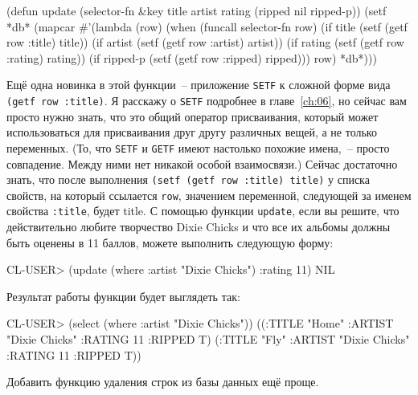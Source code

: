 \begin{myverb}
(defun update (selector-fn &key title artist rating (ripped nil ripped-p))
  (setf *db*
        (mapcar
         #'(lambda (row)
             (when (funcall selector-fn row)
               (if title    (setf (getf row :title) title))
               (if artist   (setf (getf row :artist) artist))
               (if rating   (setf (getf row :rating) rating))
               (if ripped-p (setf (getf row :ripped) ripped)))
             row) *db*)))
\end{myverb}

Ещё одна новинка в этой функции~-- приложение \lstinline{SETF} к
сложной форме вида \lstinline{(getf row :title)}. Я расскажу о \lstinline{SETF} подробнее в главе~\ref{ch:06},
но сейчас вам просто нужно знать, что это общий оператор присваивания, который может
использоваться для присваивания друг другу различных вещей, а не только переменных. (То,
что \lstinline{SETF} и \lstinline{GETF} имеют настолько похожие имена,~-- просто совпадение. Между
ними нет никакой особой взаимосвязи.) Сейчас достаточно знать, что после выполнения
\lstinline{(setf (getf row :title) title)} у списка свойств, на который ссылается \lstinline{row},
значением переменной, следующей за именем свойства \lstinline{:title}, будет title. С помощью
функции \lstinline{update}, если вы решите, что действительно любите творчество Dixie Chicks и
что все их альбомы должны быть оценены в 11 баллов, можете выполнить следующую
форму:

\begin{myverb}
CL-USER> (update (where :artist "Dixie Chicks") :rating 11)
NIL
\end{myverb}

Результат работы функции будет выглядеть так:

\begin{myverb}
CL-USER> (select (where :artist "Dixie Chicks"))
((:TITLE "Home" :ARTIST "Dixie Chicks" :RATING 11 :RIPPED T)
 (:TITLE "Fly" :ARTIST "Dixie Chicks" :RATING 11 :RIPPED T))
\end{myverb}

Добавить функцию удаления строк из базы данных ещё проще.


